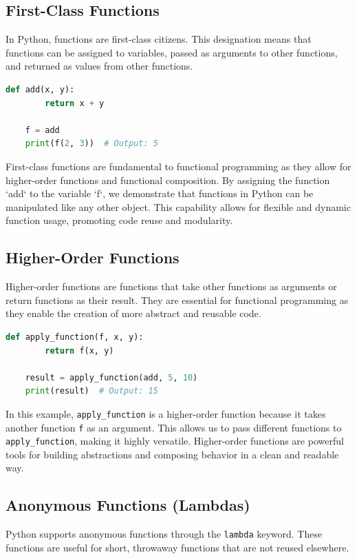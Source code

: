 \documentclass[a4paper]{article}
\begin{document}
\subsection{First-Class Functions}
In Python, functions are first-class citizens. This designation means that functions can be assigned to variables, passed as arguments to other functions, and returned as values from other functions.\\

\begin{lstlisting}[language=Python, caption=First-Class Functions]
    def add(x, y):
        return x + y

    f = add
    print(f(2, 3))  # Output: 5
\end{lstlisting}

First-class functions are fundamental to functional programming as they allow for higher-order functions and functional composition. By assigning the function `add` to the variable `f`, we demonstrate that functions in Python can be manipulated like any other object. This capability allows for flexible and dynamic function usage, promoting code reuse and modularity.\\

\subsection{Higher-Order Functions}
Higher-order functions are functions that take other functions as arguments or return functions as their result. They are essential for functional programming as they enable the creation of more abstract and reusable code.\\

\begin{lstlisting}[language=Python, caption=Higher-Order Functions]
    def apply_function(f, x, y):
        return f(x, y)

    result = apply_function(add, 5, 10)
    print(result)  # Output: 15
\end{lstlisting}

In this example, \texttt{apply\_function} is a higher-order function because it takes another function \texttt{f} as an argument. This allows us to pass different functions to \texttt{apply\_function}, making it highly versatile. Higher-order functions are powerful tools for building abstractions and composing behavior in a clean and readable way.\\

\subsection{Anonymous Functions (Lambdas)}
Python supports anonymous functions through the \texttt{lambda} keyword. These functions are useful for short, throwaway functions that are not reused elsewhere.\\
\end{document}
